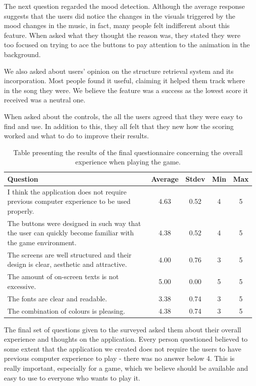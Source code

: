 The next question regarded the mood detection. Although the average response suggests that the users did notice the changes in the visuals triggered by the mood changes in the music, in fact, many people felt indifferent about this feature. When asked what they thought the reason was, they stated they were too focused on trying to ace the buttons to pay attention to the animation in the background.

We also asked about users' opinion on the structure retrieval system and its incorporation. Most people found it useful, claiming it helped them track where in the song they were. We believe the feature was a success as the lowest score it received was a neutral one. 

When asked about the controls, the all the users agreed that they were easy to find and use. In addition to this, they all felt that they new how the scoring worked and what to do to improve their results. 

\begin{table}
\begin{center}
\begin{tabular}{| p{8cm} | c | c | c | c | } 																			   \hline 
 \textbf{Question} & \textbf{Average} & \textbf{Stdev} & \textbf{Min} & \textbf{Max }	\\ \hline \hline
 I think the application does not require previous computer experience to be used properly. & 4.63 & 0.52 & 4 & 5 \\ \hline
 The buttons were designed in such way that the user can quickly become familiar with the game environment. & 4.38 & 0.52 & 4 & 5 \\ \hline
 The screens are well structured and their design is clear, aesthetic and attractive.  & 4.00 & 0.76 & 3 & 5 \\ \hline
 The amount of on-screen texts is not excessive. 	& 5.00 & 0.00 & 5 & 5 \\ \hline
 The fonts are clear and readable. 						& 3.38 & 0.74 & 3 & 5 \\ \hline
 The combination of colours is pleasing. 				& 4.38 & 0.74 & 3 & 5 \\ \hline
 \end{tabular}
\caption{Table presenting the results of the final questionnaire concerning the overall experience when playing the game.}
\label{table:finalquestionsoverall}
\end{center}
\end{table}

The final set of questions given to the surveyed asked them about their overall experience and thoughts on the application. Every person questioned believed to some extent that the application we created does not require the users to have previous computer experience to play - there was no answer below 4. This is really important, especially for a game, which we believe should be available and easy to use to everyone who wants to play it. 

